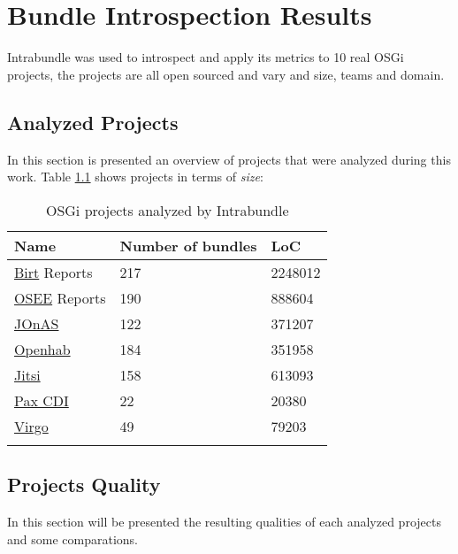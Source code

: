 \chapter{Bundle Introspection Results}

Intrabundle was used to introspect and apply its metrics to 10 real OSGi projects, the projects are all open sourced and vary and size, teams and domain. 

\section{Analyzed Projects}
In this section is presented an overview of projects that were analyzed during this work. Table \ref{osgi-analyzed-projects} shows projects in terms of \emph{size}:

\begin{table}[h]
\caption{OSGi projects analyzed by Intrabundle}
\label{osgi-analyzed-projects}
\begin{center}
    \begin{tabular}{  p{5cm} | p{5cm} | p{4cm}}
    \Xhline{2\arrayrulewidth}
    Name & Number of bundles & LoC \\  \hline
    \href{http://eclipse.org/birt/}{Birt} Reports & 217 & 2248012\\ \hline
    \href{https://eclipse.org/osee/}{OSEE} Reports & 190 & 888604\\ \hline
    \href{http://jonas.ow2.org/xwiki/bin/view/Main/}{JOnAS} & 122 & 371207\\ \hline
    \href{http://www.openhab.org/}{Openhab} & 184 & 351958\\ \hline
    \href{https://jitsi.org/}{Jitsi} & 158 & 613093\\ \hline
    \href{http://team.ops4j.org/wiki/display/paxcdi/}{Pax CDI} & 22 & 20380\\ \hline 
    \href{www.eclipse.org/virgo/}{Virgo} & 49 & 79203\\ 


   \Xhline{2\arrayrulewidth}

    \end{tabular}
\end{center}
\end{table}
\FloatBarrier 



\section{Projects Quality}
In this section will be presented the resulting qualities of each analyzed projects and some comparations.

